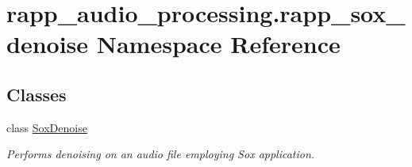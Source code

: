 \hypertarget{namespacerapp__audio__processing_1_1rapp__sox__denoise}{\section{rapp\-\_\-audio\-\_\-processing.\-rapp\-\_\-sox\-\_\-denoise Namespace Reference}
\label{namespacerapp__audio__processing_1_1rapp__sox__denoise}
}
\subsection*{Classes}
\begin{DoxyCompactItemize}
\item 
class \hyperlink{classrapp__audio__processing_1_1rapp__sox__denoise_1_1SoxDenoise}{Sox\-Denoise}
\begin{DoxyCompactList}\small\item\em Performs denoising on an audio file employing Sox application. \end{DoxyCompactList}\end{DoxyCompactItemize}
